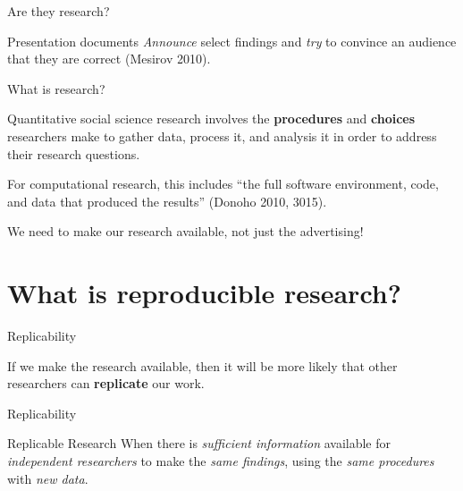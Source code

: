 \documentclass[10pt]{beamer}
\begin{document}
\begin{frame}{Are they research?}

    \begin{block}{Presentation documents}
        \emph{Announce} select findings and \emph{try} to convince an audience that they are correct (Mesirov 2010).
    \end{block}
\end{frame}

\begin{frame}{What is research?}

    Quantitative social science research involves the \textbf{procedures} and \textbf{choices} researchers make to gather data, process it, and analysis it in order to address their research questions.

    \vspace{1cm}

    For {\large{computational research}}, this includes ``the {\large{full software environment, code, and data}} that produced the results'' (Donoho 2010, 3015).

\end{frame}

\begin{frame}
    \begin{center}
        {\large{We need to make our research available, not just the advertising!}}
    \end{center}
\end{frame}


\section{What is reproducible research?}

\begin{frame}{Replicability}

    If we make the research available, then it will be {\large{more likely}} that other researchers can \textbf{replicate} our work.

\end{frame}

\begin{frame}{Replicability}

    \begin{exampleblock}{Replicable Research}
        When there is \emph{sufficient information} available for \emph{independent researchers} to make the \emph{same findings}, using the \emph{same procedures} with \emph{new data}.
    \end{exampleblock}

\end{frame}
\end{document}
